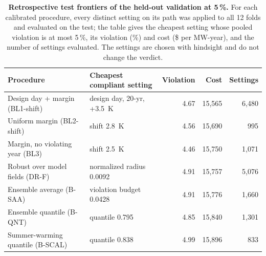 \begin{table}[htbp]
\centering
\footnotesize
\caption{\textbf{Retrospective test frontiers of the held-out validation at 5\,\%.} For each calibrated procedure, every distinct setting on its path was applied to all 12 folds and evaluated on the test; the table gives the cheapest setting whose pooled violation is at most 5\,\%, its violation (\%) and cost (\$ per MW-year), and the number of settings evaluated. The settings are chosen with hindsight and do not change the verdict.}\label{tab:s13}
\begin{tabular}{@{}llrrr@{}}
\toprule
Procedure & Cheapest compliant setting & Violation & Cost & Settings\\
\midrule
Design day + margin (BL1-shift) & design day, 20-yr, +3.5~K & 4.67 & 15,565 & 6,480 \\
Uniform margin (BL2-shift) & shift 2.8~K & 4.56 & 15,690 & 995 \\
Margin, no violating year (BL3) & shift 2.5~K & 4.46 & 15,750 & 1,071 \\
Robust over model fields (DR-F) & normalized radius 0.0092 & 4.91 & 15,757 & 5,076 \\
Ensemble average (B-SAA) & violation budget 0.0428 & 4.91 & 15,776 & 1,660 \\
Ensemble quantile (B-QNT) & quantile 0.795 & 4.85 & 15,840 & 1,301 \\
Summer-warming quantile (B-SCAL) & quantile 0.838 & 4.99 & 15,896 & 833 \\
\bottomrule
\end{tabular}
\end{table}

